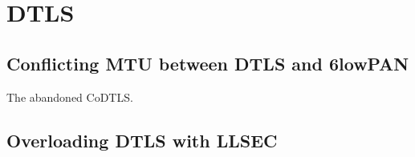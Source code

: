 \chapter{DTLS}

\section{Conflicting MTU between DTLS and 6lowPAN}
The abandoned CoDTLS.
\section{Overloading DTLS with LLSEC}